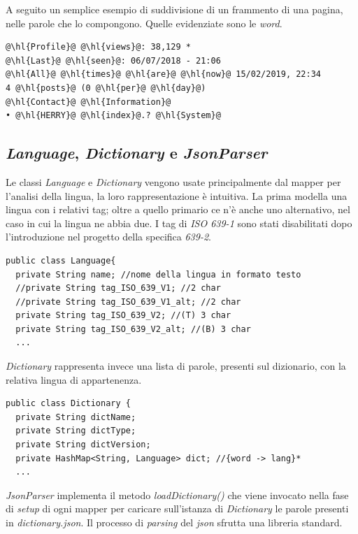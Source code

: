 \documentclass{article}
\newcommand{\isoOne}{\textit{ISO 639-1}}
\newcommand{\filename}[1]{\textit{#1}}
\newcommand{\class}[1]{\textit{#1}}
\newcommand{\function}[1]{\textit{#1}}
\begin{document}
A seguito un semplice esempio di suddivisione di un frammento di una pagina, nelle parole che lo compongono. Quelle evidenziate sono le \textit{word}.

\begin{verbatim}
@\hl{Profile}@ @\hl{views}@: 38,129 *
@\hl{Last}@ @\hl{seen}@: 06/07/2018 - 21:06
@\hl{All}@ @\hl{times}@ @\hl{are}@ @\hl{now}@ 15/02/2019, 22:34
4 @\hl{posts}@ (0 @\hl{per}@ @\hl{day}@)
@\hl{Contact}@ @\hl{Information}@
• @\hl{HERRY}@ @\hl{index}@.? @\hl{System}@
\end{verbatim}

\subsection{\class{Language}, \class{Dictionary} e \class{JsonParser}}

Le classi \class{Language} e \class{Dictionary} vengono usate principalmente dal mapper per l'analisi della lingua, la loro rappresentazione è intuitiva. La prima modella una lingua con i relativi tag; oltre a quello primario ce n'è anche uno alternativo, nel caso in cui la lingua ne abbia due. I tag di \isoOne{} sono stati disabilitati dopo l'introduzione nel progetto della specifica \textit{639-2}. 

\begin{verbatim}
public class Language{
  private String name; //nome della lingua in formato testo
  //private String tag_ISO_639_V1; //2 char
  //private String tag_ISO_639_V1_alt; //2 char
  private String tag_ISO_639_V2; //(T) 3 char
  private String tag_ISO_639_V2_alt; //(B) 3 char
  ...
\end{verbatim}
\noindent
\class{Dictionary} rappresenta invece una lista di parole, presenti sul dizionario, con la relativa lingua di appartenenza. 

\begin{verbatim}
public class Dictionary {
  private String dictName;
  private String dictType;
  private String dictVersion;
  private HashMap<String, Language> dict; //{word -> lang}*
  ...
\end{verbatim}

\noindent
\class{JsonParser} implementa il metodo \function{loadDictionary()} che viene invocato nella fase di \textit{setup} di ogni mapper per caricare sull'istanza di \class{Dictionary} le parole presenti in \filename{dictionary.json}. Il processo di \textit{parsing} del \textit{json} sfrutta una libreria standard.
\end{document}
